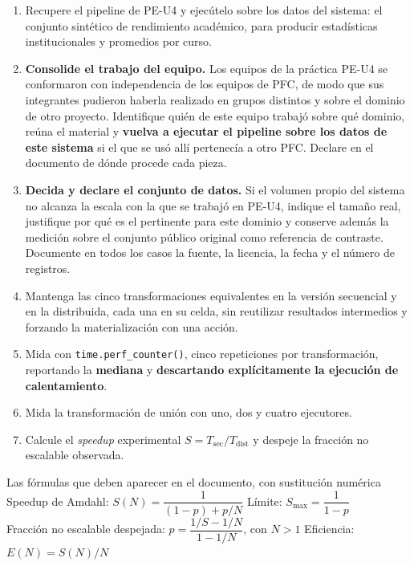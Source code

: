 \documentclass[11pt,a4paper]{article}
\begin{document}
	\begin{enumerate}[leftmargin=*,itemsep=4pt]
		\item Recupere el pipeline de PE-U4 y ejecútelo sobre los datos del sistema: el conjunto sintético de rendimiento académico, para producir estadísticas institucionales y promedios por curso.
		\item \textbf{Consolide el trabajo del equipo.} Los equipos de la práctica PE-U4 se conformaron con independencia de los equipos de PFC, de modo que sus integrantes pudieron haberla realizado en grupos distintos y sobre el dominio de otro proyecto. Identifique quién de este equipo trabajó sobre qué dominio, reúna el material y \textbf{vuelva a ejecutar el pipeline sobre los datos de este sistema} si el que se usó allí pertenecía a otro PFC. Declare en el documento de dónde procede cada pieza.
		\item \textbf{Decida y declare el conjunto de datos.} Si el volumen propio del sistema no alcanza la escala con la que se trabajó en PE-U4, indique el tamaño real, justifique por qué es el pertinente para este dominio y conserve además la medición sobre el conjunto público original como referencia de contraste. Documente en todos los casos la fuente, la licencia, la fecha y el número de registros.
		\item Mantenga las cinco transformaciones equivalentes en la versión secuencial y en la distribuida, cada una en su celda, sin reutilizar resultados intermedios y forzando la materialización con una acción.
		\item Mida con \texttt{time.perf\_counter()}, cinco repeticiones por transformación, reportando la \textbf{mediana} y \textbf{descartando explícitamente la ejecución de calentamiento}.
		\item Mida la transformación de unión con uno, dos y cuatro ejecutores.
		\item Calcule el \emph{speedup} experimental $S = T_{\text{sec}} / T_{\text{dist}}$ y despeje la fracción no escalable observada.
	\end{enumerate}
	
	\begin{defBox}{Las fórmulas que deben aparecer en el documento, con sustitución numérica}
		Speedup de Amdahl: $S(N) = \dfrac{1}{(1-p) + p/N}$ \qquad Límite: $S_{\max} = \dfrac{1}{1-p}$\\[4pt]
		Fracción no escalable despejada: $p = \dfrac{1/S - 1/N}{1 - 1/N}$, con $N>1$ \qquad Eficiencia: $E(N) = S(N)/N$
	\end{defBox}
	
\end{document}
